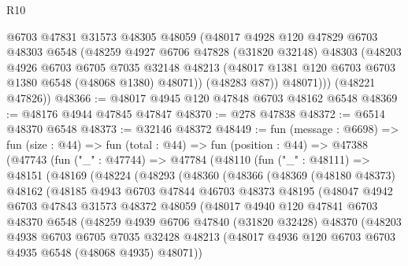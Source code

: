 \begin{lexlean}{R10}
\begin{coremodule}
          @6703
          @47831
          @31573
          @48305
          @48059
          (@48017
            @4928
            @120
            @47829
            @6703
            @48303
            @6548
            (@48259
              @4927
              @6706
              @47828
              (@31820 @32148)
              @48303
              (@48203
                @4926
                @6703
                @6705
                @7035
                @32148
                @48213
                (@48017 @1381 @120 @6703 @6703 @1380 @6548 (@48068 @1380) @48071))
              (@48283 @87))
            @48071)))
      (@48221 @47826))
@48366 := @48017 @4945 @120 @47848 @6703 @48162 @6548
@48369 := @48176 @4944 @47845 @47847
@48370 := @278 @47838
@48372 := @6514 @48370 @6548
@48373 := @32146 @48372
@48449 := fun (message : @6698) =>
  fun (size : @44) =>
  fun (total : @44) =>
  fun (position : @44) =>
  @47388
    (@47743
      (fun ("_" : @47744) =>
      @47784
        (@48110
          (fun ("_" : @48111) =>
          @48151
            (@48169
              (@48224
                (@48293
                  (@48360
                    (@48366
                      (@48369
                        (@48180 @48373)
                        @48162
                        (@48185
                          @4943
                          @6703
                          @47844
                          @46703
                          @48373
                          @48195
                          (@48047
                            @4942
                            @6703
                            @47843
                            @31573
                            @48372
                            @48059
                            (@48017
                              @4940
                              @120
                              @47841
                              @6703
                              @48370
                              @6548
                              (@48259
                                @4939
                                @6706
                                @47840
                                (@31820 @32428)
                                @48370
                                (@48203
                                  @4938
                                  @6703
                                  @6705
                                  @7035
                                  @32428
                                  @48213
                                  (@48017 @4936 @120 @6703 @6703 @4935 @6548 (@48068 @4935) @48071))

\end{coremodule}
\end{lexlean}
